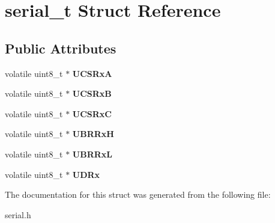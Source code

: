 \hypertarget{structserial__t}{}\section{serial\+\_\+t Struct Reference}
\label{structserial__t}
\subsection*{Public Attributes}
\begin{DoxyCompactItemize}
\item 
\mbox{\label{structserial__t_a217e81ee8801f862b447e651016bb71b}} 
volatile uint8\+\_\+t $\ast$ {\bfseries U\+C\+S\+RxA}
\item 
\mbox{\label{structserial__t_a2e14c00b5f729305a98f44927d91fa65}} 
volatile uint8\+\_\+t $\ast$ {\bfseries U\+C\+S\+RxB}
\item 
\mbox{\label{structserial__t_aeb6357850a478ff1c9f50f342764ed3a}} 
volatile uint8\+\_\+t $\ast$ {\bfseries U\+C\+S\+RxC}
\item 
\mbox{\label{structserial__t_ae458e42ede033302f20deeb82d51d282}} 
volatile uint8\+\_\+t $\ast$ {\bfseries U\+B\+R\+RxH}
\item 
\mbox{\label{structserial__t_a9f1c7df5c88c819e1b858fede2735e82}} 
volatile uint8\+\_\+t $\ast$ {\bfseries U\+B\+R\+RxL}
\item 
\mbox{\label{structserial__t_a4bdffabefd1f4ca2c15c249ff6300510}} 
volatile uint8\+\_\+t $\ast$ {\bfseries U\+D\+Rx}
\end{DoxyCompactItemize}


The documentation for this struct was generated from the following file\+:\begin{DoxyCompactItemize}
\item 
serial.\+h\end{DoxyCompactItemize}

